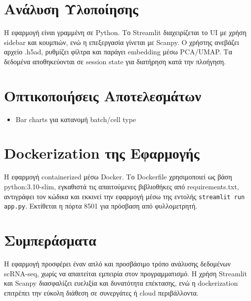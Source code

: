 \documentclass[a4paper,10pt]{article}
\begin{document}
\section{Ανάλυση Υλοποίησης}
Η εφαρμογή είναι γραμμένη σε Python. Το Streamlit διαχειρίζεται το UI με χρήση sidebar και κουμπιών, ενώ η επεξεργασία γίνεται με Scanpy. Ο χρήστης ανεβάζει αρχείο .h5ad, ρυθμίζει φίλτρα και παράγει embedding μέσω PCA/UMAP. Τα δεδομένα αποθηκεύονται σε session state για διατήρηση κατά την πλοήγηση.

\section{Οπτικοποιήσεις Αποτελεσμάτων}

\begin{itemize}
  \item Bar charts για κατανομή batch/cell type
\end{itemize}

\section{Dockerization της Εφαρμογής}

Η εφαρμογή containerized μέσω Docker. Το Dockerfile χρησιμοποιεί ως βάση python:3.10-slim, εγκαθιστά τις απαιτούμενες βιβλιοθήκες από requirements.txt, αντιγράφει τον κώδικα και εκκινεί την εφαρμογή μέσω της εντολής \texttt{streamlit run app.py}. Εκτίθεται η πόρτα 8501 για πρόσβαση από φυλλομετρητή.

\section{Συμπεράσματα}
Η εφαρμογή προσφέρει έναν απλό και προσβάσιμο τρόπο ανάλυσης δεδομένων scRNA-seq, χωρίς να απαιτείται εμπειρία στον προγραμματισμό. Η χρήση Streamlit και Scanpy διασφαλίζει ευελιξία και δυνατότητα επέκτασης, ενώ η dockerization επιτρέπει την εύκολη διάθεση σε συνεργάτες ή cloud περιβάλλοντα.
\end{document}
